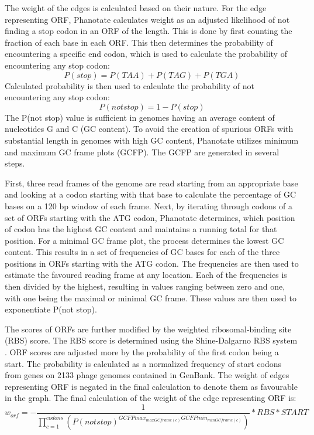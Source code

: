The weight of the edges is calculated based on their nature. For the edge representing ORF, Phanotate calculates weight as an adjusted likelihood of not finding a stop codon in an ORF of the length. This is done by first counting the fraction of each base in each ORF. This then determines the probability of encountering a specific end codon, which is used to calculate the probability of encountering any stop codon:
\[ P(stop) = P(TAA) + P(TAG) + P(TGA) \]
Calculated probability is then used to calculate the probability of not encountering any stop codon:
\[ P(not stop) = 1 - P(stop) \]
The P(not stop) value is sufficient in genomes having an average content of nucleotides G and C (GC content). To avoid the creation of spurious ORFs with substantial length in genomes with high GC content, Phanotate utilizes minimum and maximum GC frame plots (GCFP). The GCFP are generated in several steps. 

First, three read frames of the genome are read starting from an appropriate base and looking at a codon starting with that base to calculate the percentage of GC bases on a 120 bp window of each frame. Next, by iterating through codons of a set of ORFs starting with the ATG codon, Phanotate determines, which position of codon has the highest GC content and maintains a running total for that position. For a minimal GC frame plot, the process determines the lowest GC content. This results in a set of frequencies of GC bases for each of the three positions in ORFs starting with the ATG codon. The frequencies are then used to estimate the favoured reading frame at any location. Each of the frequencies is then divided by the highest, resulting in values ranging between zero and one, with one being the maximal or minimal GC frame. These values are then used to exponentiate P(not stop).

The scores of ORFs are further modified by the weighted ribosomal-binding site (RBS) score. The RBS score is determined using the Shine-Dalgarno RBS system \cite{hyatt2010prodigal}. ORF scores are adjusted more by the probability of the first codon being a start. The probability is calculated as a normalized frequency of start codons from genes on 2133 phage genomes contained in GenBank. The weight of edges representing ORF is negated in the final calculation to denote them as favourable in the graph. The final calculation of the weight of the edge representing ORF is:
\[ w_{orf} = - \frac{1}{\prod\limits_{c=1}^{codons}(P(not stop)^{GCFPmax_{maxGCframe(c)} GCFPmin_{minGCframe(c)}})} * RBS * START \]

